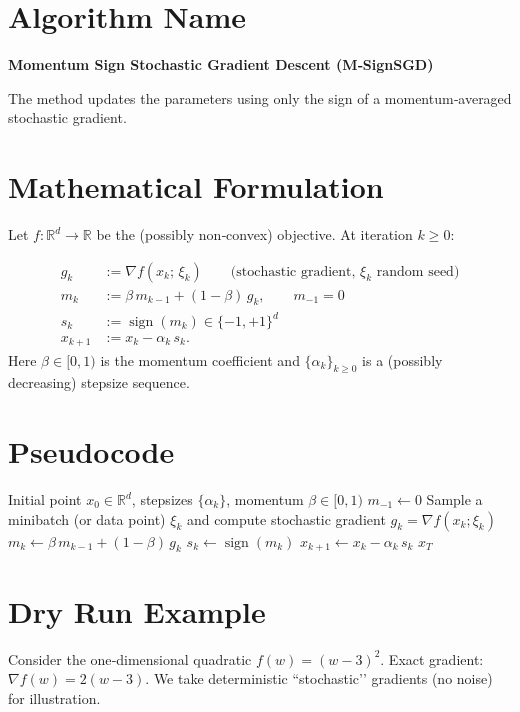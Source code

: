 \documentclass{article}
\newcommand{\sign}{\operatorname{sign}}
\newcommand{\R}{\mathbb{R}}
\begin{document}
\section*{Algorithm Name}
\textbf{Momentum Sign Stochastic Gradient Descent (M‑SignSGD)}  

The method updates the parameters using only the sign of a momentum‑averaged stochastic gradient.

\section*{Mathematical Formulation}
Let $f:\R^{d}\rightarrow\R$ be the (possibly non‑convex) objective.  
At iteration $k\ge 0$:

\begin{align}
    g_k &:= \nabla f(x_k;\,\xi_k) \qquad\text{(stochastic gradient, $\xi_k$ random seed)}\label{eq:grad}\\[4pt]
    m_k &:= \beta\, m_{k-1} + (1-\beta)\, g_k ,\qquad m_{-1}=0 \label{eq:momentum}\\[4pt]
    s_k &:= \sign(m_k)\in\{-1,+1\}^{d} \label{eq:sign}\\[4pt]
    x_{k+1} &:= x_k - \alpha_k\, s_k .\label{eq:update}
\end{align}
Here $\beta\in[0,1)$ is the momentum coefficient and $\{\alpha_k\}_{k\ge0}$ is a (possibly decreasing) stepsize sequence.

\section*{Pseudocode}
\begin{algorithm}[H]
\caption{M‑SignSGD}
\begin{algorithmic}[1]
\REQUIRE Initial point $x_0\in\R^{d}$, stepsizes $\{\alpha_k\}$, momentum $\beta\in[0,1)$
\STATE $m_{-1}\gets 0$
    \STATE Sample a minibatch (or data point) $\xi_k$ and compute stochastic gradient $g_k=\nabla f(x_k;\xi_k)$
    \STATE $m_k \gets \beta\, m_{k-1} + (1-\beta)\, g_k$
    \STATE $s_k \gets \sign(m_k)$ 
    \STATE $x_{k+1} \gets x_k - \alpha_k\, s_k$
\ENDFOR
\RETURN $x_T$
\end{algorithmic}
\end{algorithm}

\section*{Dry Run Example}
Consider the one‑dimensional quadratic $f(w)=(w-3)^2$.  
Exact gradient: $\nabla f(w)=2(w-3)$.  
We take deterministic “stochastic’’ gradients (no noise) for illustration.
\end{document}

